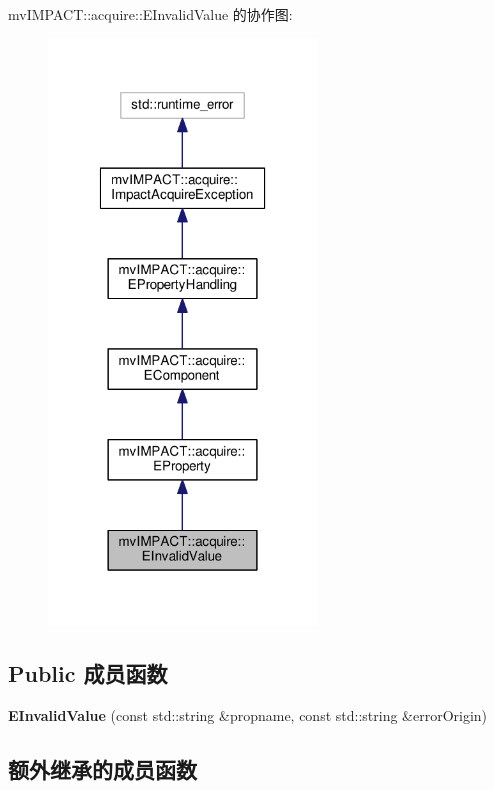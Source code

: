 mv\+I\+M\+P\+A\+C\+T\+:\+:acquire\+:\+:E\+Invalid\+Value 的协作图\+:
\nopagebreak
\begin{figure}[H]
\begin{center}
\leavevmode
\includegraphics[width=202pt]{classmv_i_m_p_a_c_t_1_1acquire_1_1_e_invalid_value__coll__graph}
\end{center}
\end{figure}
\subsection*{Public 成员函数}
\begin{DoxyCompactItemize}
\item 
\hypertarget{classmv_i_m_p_a_c_t_1_1acquire_1_1_e_invalid_value_a457f10372491e903130d67faa4eec0ff}{{\bfseries E\+Invalid\+Value} (const std\+::string \&propname, const std\+::string \&error\+Origin)}\label{classmv_i_m_p_a_c_t_1_1acquire_1_1_e_invalid_value_a457f10372491e903130d67faa4eec0ff}

\end{DoxyCompactItemize}
\subsection*{额外继承的成员函数}


